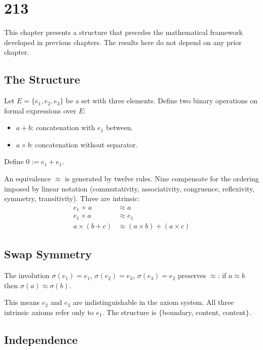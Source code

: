\chapter{213}
\label{ch:213}


This chapter presents a structure that precedes
the mathematical framework developed in previous chapters.
The results here do not depend on any prior chapter.

\section{The Structure}

Let $E = \{e_1, e_2, e_3\}$ be a set with three elements.
Define two binary operations on formal expressions over $E$:
\begin{itemize}
\item $a + b$: concatenation with $e_1$ between.
\item $a \times b$: concatenation without separator.
\end{itemize}
Define $0 := e_1 + e_1$.

An equivalence $\approx$ is generated by twelve rules.
Nine compensate for the ordering imposed by linear notation
(commutativity, associativity, congruence, reflexivity,
symmetry, transitivity).
Three are intrinsic:
\begin{align}
e_1 + a &\approx a \label{eq:a8} \\
e_1 \times a &\approx e_1 \label{eq:a9} \\
a \times (b + c) &\approx
  (a \times b) + (a \times c) \label{eq:a12}
\end{align}

\section{Swap Symmetry}

The involution $\sigma(e_1) = e_1$,
$\sigma(e_2) = e_3$, $\sigma(e_3) = e_2$
preserves $\approx$: if $a \approx b$ then
$\sigma(a) \approx \sigma(b)$.

This means $e_2$ and $e_3$ are indistinguishable
in the axiom system.
All three intrinsic axioms refer only to $e_1$.
The structure is $\{$boundary, content, content$\}$.

\section{Independence}

